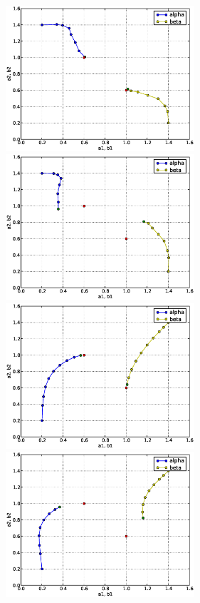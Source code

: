 \begin{figure}
  \begin{center}
    \includegraphics[width=7cm]{chapters/schroll/eps/4D-1scan1b.eps}
    \includegraphics[width=7cm]{chapters/schroll/eps/4D-1scan1b-5.eps}
    \includegraphics[width=7cm]{chapters/schroll/eps/4D-1scan2b.eps}
    \includegraphics[width=7cm]{chapters/schroll/eps/4D-1scan2b-5.eps}

\end{center}
\end{figure}

